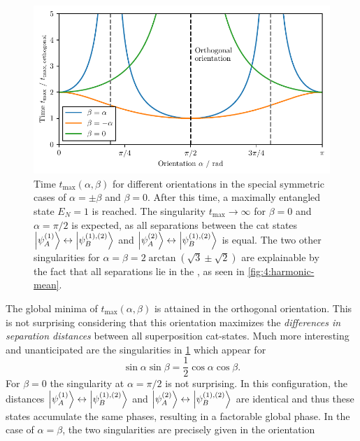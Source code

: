 \begin{figure}[!htbp]
  \centering
  \includegraphics[width=\textwidth]{./../figures/ideal-entanglement/t-max-orientation.pdf}
  \caption{Time $t_\mathrm{max}(\alpha, \beta)$ for different orientations in the special symmetric cases of $\alpha = \pm \beta$ and $\beta = 0$. After this time, a maximally entangled state $E_N = 1$ is reached. The singularity $t_\mathrm{max} \rightarrow \infty$ for $\beta = 0$ and $\alpha = \pi/2$ is expected, as all separations between the cat states $\ket{\psi_A^{(1)}}\leftrightarrow\ket{\psi_B^{(1),(2)}}$ and $\ket{\psi_A^{(2)}}\leftrightarrow\ket{\psi_B^{(1),(2)}}$ is equal. The two other singularities for $\alpha = \beta = 2 \arctan(\sqrt{3} \pm \sqrt{2})$ are explainable by the fact that all separations lie in the , as seen in \cref{fig:4:harmonic-mean}.}
  \label{fig:4:t-max-orientation}
\end{figure}
The global minima of $t_\mathrm{max}(\alpha,\beta)$ is attained in the orthogonal orientation. This is not surprising considering that this orientation maximizes the \textit{differences in separation distances} between all superposition cat-states.
Much more interesting and unanticipated are the singularities in \cref{fig:4:t-max-orientation} which appear for 
\begin{equation}
  \sin\alpha\sin\beta=\frac{1}{2}\cos\alpha\cos\beta .
\end{equation}
For $\beta=0$ the singularity at $\alpha=\pi/2$ is not surprising. In this configuration, the distances $\ket{\psi^{(1)}_A}\leftrightarrow\ket{\psi^{(1),(2)}_B}$ and $\ket{\psi^{(2)}_A}\leftrightarrow\ket{\psi^{(1),(2)}_B}$ are identical and thus these states accumulate the same phases, resulting in a factorable global phase.
In the case of $\alpha=\beta$, the two singularities are precisely given in the orientation
